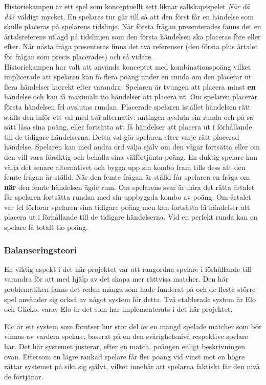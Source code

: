 \documentclass[a4paper, 11pt]{article}
\begin{document}
Historiekampen är ett spel som konceptuellt sett liknar sällskapsspelet \textit{När då då?} väldigt mycket. En spelares tur går till så att den först får en händelse som skulle placeras på spelarens tidslinje. När första frågan presenterades fanns det en årtalsreferens utlagd på tidslinjen som den första händelsen ska placeras före eller efter. När nästa fråga presenteras finns det två referenser (den första plus årtalet för frågan som precis placerades) och så vidare.\\ 
Historiekampen har valt att använda konceptet med kombinationspoäng vilket implicerade att spelaren kan få flera poäng under en runda om den placerar ut flera händelser korrekt efter varandra. Spelaren är tvungen att placera minst \textbf{en} händelse och kan få maximalt tio händelser att placera ut. Om spelaren placerar första händelsen fel avslutas rundan. Placerade spelaren istället händelsen rätt ställs den inför ett val med två alternativ: antingen avsluta sin runda och på så sätt låsa sina poäng, eller fortsätta att få händelser att placera ut i förhållande till de tidigare händelserna. Detta val gör spelaren efter varje rätt placerad händelse. Spelaren kan med andra ord välja själv om den vågar fortsätta eller om den vill vara försiktig och behålla sina välförtjänta poäng. En duktig spelare kan välja det senare alternativet och bygga upp sin kombo fram tills dess att den femte frågan är ställd. När den femte frågan är ställd får spelaren en fråga om \textbf{när} den femte händelsen ägde rum. Om spelarens svar är nära det rätta årtalet får spelaren fortsätta rundan med sin uppbyggda kombo av poäng. Om årtalet var fel förlorar spelaren sina tidigare poäng men kan fortsätta få händelser att placera ut i förhållande till de tidigare händelserna. Vid en perfekt runda kan en spelare få totalt tio poäng.

\subsubsection{Balanseringsteori}
En viktig aspekt i det här projektet var att rangordna spelare i förhållande till varandra för att med hjälp av det skapa mer rättvisa matcher. Den här problematiken fanns det redan många som hade funderat på och de flesta större spel använder sig också av något system för detta. Två etablerade system är Elo och Glicko, varav Elo är det som har implementerats i det här projektet.

Elo är ett system som förutser hur stor del av en mängd spelade matcher som bör vinnas av vardera spelare, baserat på en den svårighetsnivå respektive spelare har. Det här systemet justerar, efter en match, poängen enligt beskrivningen ovan. Eftersom en lägre rankad spelare får fler poäng vid vinst mot en högre rättar systemet på sikt sig självt, vilket innebär att spelarna faktiskt får den nivå de förtjänar.
\end{document}
